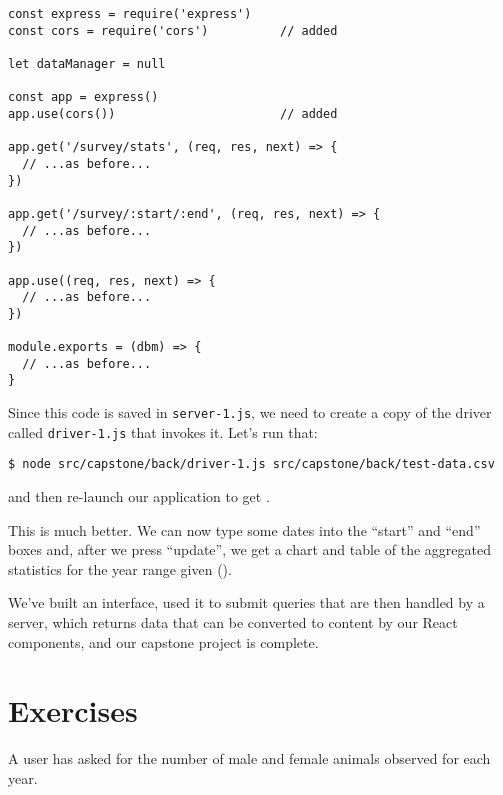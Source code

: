 \begin{verbatim}
const express = require('express')
const cors = require('cors')          // added

let dataManager = null

const app = express()
app.use(cors())                       // added

app.get('/survey/stats', (req, res, next) => {
  // ...as before...
})

app.get('/survey/:start/:end', (req, res, next) => {
  // ...as before...
})

app.use((req, res, next) => {
  // ...as before...
})

module.exports = (dbm) => {
  // ...as before...
}
\end{verbatim}

Since this code is saved in \texttt{server-1.js},
we need to create a copy of the driver called \texttt{driver-1.js} that invokes it.
Let's run that:

\begin{verbatim}
$ node src/capstone/back/driver-1.js src/capstone/back/test-data.csv
\end{verbatim}

\noindent
and then re-launch our application to get .


This is much better.
We can now type some dates into the ``start'' and ``end'' boxes and,
after we press ``update'',
we get a chart and table of the aggregated statistics for the year range given
().


We've built an interface,
used it to submit queries that are then handled by a server,
which returns data that can be converted to content by our React components,
and our capstone project is complete.

\section{Exercises}\label{s:capstone-exercises}


A user has asked for the number of male and female animals observed for each year.

